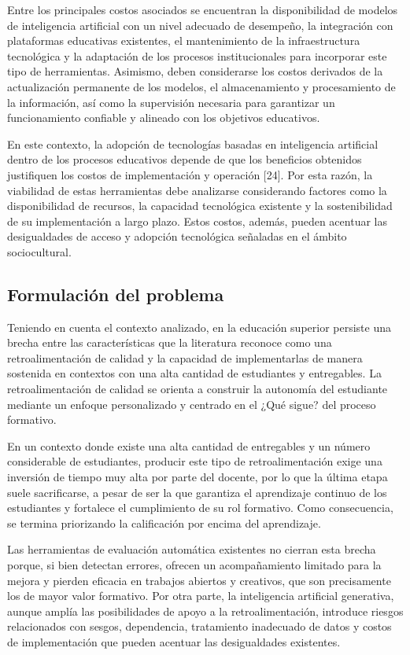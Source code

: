 \documentclass[letterpaper, 10 pt, conference]{ieeeconf}  %
\begin{document}
    Entre los principales costos asociados se encuentran la disponibilidad de modelos de inteligencia artificial con un nivel adecuado de desempeño, la integración con plataformas educativas existentes, el mantenimiento de la infraestructura tecnológica y la adaptación de los procesos institucionales para incorporar este tipo de herramientas. Asimismo, deben considerarse los costos derivados de la actualización permanente de los modelos, el almacenamiento y procesamiento de la información, así como la supervisión necesaria para garantizar un funcionamiento confiable y alineado con los objetivos educativos.

    En este contexto, la adopción de tecnologías basadas en inteligencia artificial dentro de los procesos educativos depende de que los beneficios obtenidos justifiquen los costos de implementación y operación [24]. Por esta razón, la viabilidad de estas herramientas debe analizarse considerando factores como la disponibilidad de recursos, la capacidad tecnológica existente y la sostenibilidad de su implementación a largo plazo. Estos costos, además, pueden acentuar las desigualdades de acceso y adopción tecnológica señaladas en el ámbito sociocultural.


    \subsection{Formulación del problema}
    Teniendo en cuenta el contexto analizado, en la educación superior persiste una brecha entre las características que la literatura reconoce como una retroalimentación de calidad y la capacidad de implementarlas de manera sostenida en contextos con una alta cantidad de estudiantes y entregables. La retroalimentación de calidad se orienta a construir la autonomía del estudiante mediante un enfoque personalizado y centrado en el ¿Qué sigue? del proceso formativo.

    En un contexto donde existe una alta cantidad de entregables y un número considerable de estudiantes, producir este tipo de retroalimentación exige una inversión de tiempo muy alta por parte del docente, por lo que la última etapa suele sacrificarse, a pesar de ser la que garantiza el aprendizaje continuo de los estudiantes y fortalece el cumplimiento de su rol formativo. Como consecuencia, se termina priorizando la calificación por encima del aprendizaje.

    Las herramientas de evaluación automática existentes no cierran esta brecha porque, si bien detectan errores, ofrecen un acompañamiento limitado para la mejora y pierden eficacia en trabajos abiertos y creativos, que son precisamente los de mayor valor formativo. Por otra parte, la inteligencia artificial generativa, aunque amplía las posibilidades de apoyo a la retroalimentación, introduce riesgos relacionados con sesgos, dependencia, tratamiento inadecuado de datos y costos de implementación que pueden acentuar las desigualdades existentes.
\end{document}
